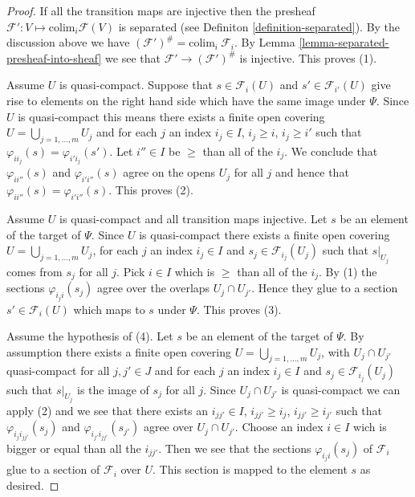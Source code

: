\begin{proof}
If all the transition maps are injective then the presheaf
$\mathcal{F}' : V \mapsto \text{colim}_i \mathcal{F}(V)$ is
separated (see Definiton \ref{definition-separated}).
By the discussion above we have
$(\mathcal{F}')^\# = \text{colim}_i\ \mathcal{F}_i$.
By Lemma \ref{lemma-separated-presheaf-into-sheaf} we see that
$\mathcal{F}' \to (\mathcal{F}')^\#$ is injective. This proves (1).

\medskip\noindent
Assume $U$ is quasi-compact.
Suppose that $s \in \mathcal{F}_i(U)$ and
$s' \in \mathcal{F}_{i'}(U)$ give rise to elements on
the right hand side which have the same image under $\Psi$.
Since $U$ is quasi-compact this means there exists
a finite open covering $U = \bigcup_{j = 1, \ldots, m} U_j$
and for each $j$ an index $i_j \in I$, $i_j \geq i$, $i_j \geq i'$
such that $\varphi_{ii_j}(s) = \varphi_{i'i_j}(s')$.
Let $i''\in I$ be $\geq$ than all of the $i_j$.
We conclude that $\varphi_{ii''}(s)$ and $\varphi_{i'i''}(s)$
agree on the opens $U_j$ for all $j$ and hence that
$\varphi_{ii''}(s) = \varphi_{i'i''}(s)$. This proves (2).

\medskip\noindent
Assume $U$ is quasi-compact and all transition maps injective.
Let $s$ be an element of the target of $\Psi$.
Since $U$ is quasi-compact
there exists a finite open covering $U = \bigcup_{j = 1, \ldots, m} U_j$,
for each $j$ an index $i_j \in I$ and $s_j \in \mathcal{F}_{i_j}(U_j)$
such that $s|_{U_j}$ comes from $s_j$ for all $j$.
Pick $i \in I$ which is $\geq$ than all of the $i_j$.
By (1) the sections $\varphi_{i_ji}(s_j)$ agree over the
overlaps $U_j \cap U_{j'}$. Hence they glue to a section
$s' \in \mathcal{F}_i(U)$ which maps to $s$ under $\Psi$.
This proves (3).

\medskip\noindent
Assume the hypothesis of (4).
Let $s$ be an element of the target of $\Psi$.
By assumption there  exists a finite open covering
$U = \bigcup_{j = 1, \ldots, m} U_j$, with $U_j \cap U_{j'}$
quasi-compact for all $j, j' \in J$ and
for each $j$ an index $i_j \in I$ and $s_j \in \mathcal{F}_{i_j}(U_j)$
such that $s|_{U_j}$ is the image of $s_j$ for all $j$.
Since $U_j \cap U_{j'}$ is quasi-compact we can apply (2)
and we see that there exists an $i_{jj'} \in I$,
$i_{jj'} \geq i_j$, $i_{jj'} \geq i_{j'}$ such that
$\varphi_{i_ji_{jj'}}(s_j)$ and $\varphi_{i_{j'}i_{jj'}}(s_{j'})$
agree over $U_j \cap U_{j'}$. Choose an index $i \in I$
wich is bigger or equal than all the $i_{jj'}$. Then we see that
the sections $\varphi_{i_ji}(s_j)$ of $\mathcal{F}_i$ glue
to a section of $\mathcal{F}_i$ over $U$. This section is mapped
to the element $s$ as desired.
\end{proof}

